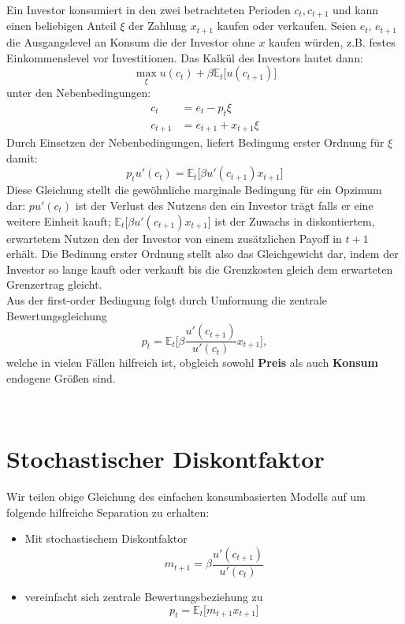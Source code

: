 \documentclass[12pt]{extreport} %
\theoremstyle{named}
\theoremstyle{nnamed}
\theoremstyle{itshape}
\theoremstyle{normal}
\begin{document}
Ein Investor konsumiert in den zwei betrachteten Perioden $c_t, c_{t+1}$ und kann einen beliebigen Anteil $\xi$ der Zahlung $x_{t+1}$ kaufen oder verkaufen. Seien $e_t$, $e_{t+1}$ die Ausgangslevel an Konsum die der Investor ohne $x$ kaufen würden, z.B. festes Einkommenslevel vor Investitionen. Das Kalkül des Investors lautet dann:
		$$ \max_{\xi} u(c_t) + \beta \mathbb{E}_t \big[ u(c_{t+1}) \big] $$
	unter den Nebenbedingungen: 
		\begin{align*}
			c_{t} & = e_t - p_t \xi \\
			c_{t+1} & = e_{t+1} + x_{t+1} \xi
		\end{align*}
Durch Einsetzen der Nebenbedingungen, liefert Bedingung erster Ordnung für $\xi$ damit:
	$$ p_t u'(c_t) = \mathbb{E}_t \big[ \beta u'(c_{t+1}) x_{t+1} \big] $$
Diese Gleichung stellt die gewöhnliche marginale Bedingung für ein Opzimum dar: $p u'(c_t)$ ist der Verlust des Nutzens den ein Investor trägt falls er eine weitere Einheit kauft; $\mathbb{E}_t \big[ \beta u'(c_{t+1}) x_{t+1} \big]$ ist der Zuwachs in diskontiertem, erwartetem Nutzen den der Investor von einem zusätzlichen Payoff in $t+1$ erhält. Die Bedinung erster Ordnung stellt also das Gleichgewicht dar, indem der Investor so lange kauft oder verkauft bis die Grenzkosten  gleich dem erwarteten Grenzertrag gleicht. ~\\

Aus der first-order Bedingung folgt durch Umformung die zentrale Bewertungsgleichung
	$$ p_t = \mathbb{E}_t \big[ \beta \frac{u'(c_{t+1})}{u'(c_t)} x_{t+1} \big], $$
welche in vielen Fällen hilfreich ist, obgleich sowohl \textbf{Preis} als auch \textbf{Konsum} endogene Größen sind. 

~\newpage

\section{Stochastischer Diskontfaktor}

Wir teilen obige Gleichung des einfachen konsumbasierten Modells auf um folgende hilfreiche Separation zu erhalten:

\begin{itemize}
	\item Mit stochastischem Diskontfaktor
	 $$ m_{t+1} = \beta \frac{u'(c_{t+1})}{u'(c_t)} $$
	\item vereinfacht sich zentrale Bewertungsbeziehung zu
	 $$ p_t = \mathbb{E}_t \big[ m_{t+1} x_{t+1} \big] $$
\end{itemize}
\end{document}

